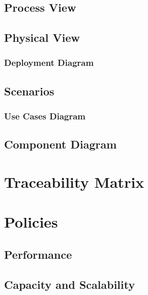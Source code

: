 \documentclass[12pt]{article}
\begin{document}
	\subsection{Process View}



	\subsection {Physical View}


	
	\subsubsection{Deployment Diagram}



	\subsection{Scenarios}

	\subsubsection{Use Cases Diagram}


	\subsection {Component Diagram}


	\section{Traceability Matrix}



\lstset{language=Java}

\section{Policies}


	\subsection{Performance}


	
	\subsection{Capacity and Scalability}
\end{document}
